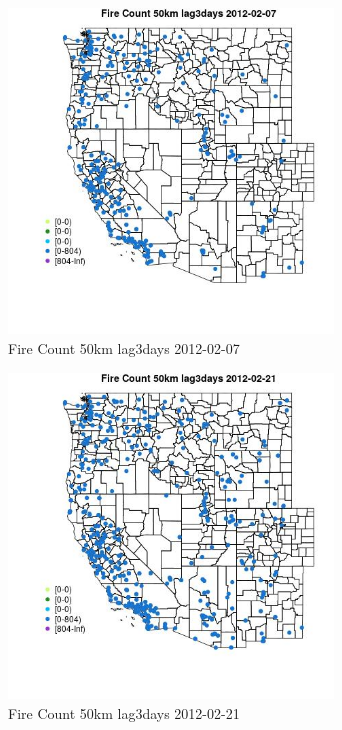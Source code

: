 \begin{figure} 
\centering  
\includegraphics[width=0.77\textwidth]{Code_Outputs/Report_ML_input_PM25_Step4_part_f_de_duplicated_aves_prioritize_24hr_obswNAs_MapObsFire_Count_50km_lag3days2012-02-07.jpg} 
\caption{\label{fig:Report_ML_input_PM25_Step4_part_f_de_duplicated_aves_prioritize_24hr_obswNAsMapObsFire_Count_50km_lag3days2012-02-07}Fire Count 50km lag3days 2012-02-07} 
\end{figure} 
 

\begin{figure} 
\centering  
\includegraphics[width=0.77\textwidth]{Code_Outputs/Report_ML_input_PM25_Step4_part_f_de_duplicated_aves_prioritize_24hr_obswNAs_MapObsFire_Count_50km_lag3days2012-02-21.jpg} 
\caption{\label{fig:Report_ML_input_PM25_Step4_part_f_de_duplicated_aves_prioritize_24hr_obswNAsMapObsFire_Count_50km_lag3days2012-02-21}Fire Count 50km lag3days 2012-02-21} 
\end{figure} 
 


